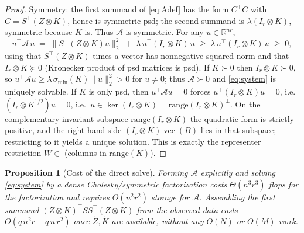 \documentclass[12pt]{article}
\DeclareMathOperator{\vecop}{vec}
\newcommand{\bR}{\mathbb{R}}
\newtheorem{proposition}{Proposition}
\begin{document}
\begin{proof}
Symmetry: the first summand of \eqref{eq:Adef} has the form $C^{\!\top}C$ with
$C=S^{\!\top}(Z\otimes K)$, hence is symmetric psd; the second summand is
$\lambda(I_r\otimes K)$, symmetric because $K$ is. Thus $\mathcal{A}$ is symmetric.
For any $u\in\bR^{nr}$,
\[
  u^{\!\top}\mathcal{A}\,u
  \;=\;\|S^{\!\top}(Z\otimes K)u\|_2^2
  \;+\;\lambda\,u^{\!\top}(I_r\otimes K)\,u
  \;\ge\;\lambda\,u^{\!\top}(I_r\otimes K)\,u\;\ge\;0,
\]
using that $S^{\!\top}(Z\otimes K)$ times a vector has nonnegative squared norm
and that $I_r\otimes K\succeq0$ (Kronecker product of psd matrices is psd).
If $K\succ0$ then $I_r\otimes K\succ0$, so $u^{\!\top}\mathcal{A}u\ge
\lambda\,\sigma_{\min}(K)\|u\|_2^2>0$ for $u\ne0$; thus $\mathcal{A}\succ0$ and
\eqref{eq:system} is uniquely solvable. If $K$ is only psd, then
$u^{\!\top}\mathcal{A}u=0$ forces $u^{\!\top}(I_r\otimes K)u=0$, i.e.\
$(I_r\otimes K^{1/2})u=0$, i.e.\ $u\in\ker(I_r\otimes K)=\mathrm{range}(I_r\otimes
K)^{\perp}$. On the complementary invariant subspace $\mathrm{range}(I_r\otimes K)$
the quadratic form is strictly positive, and the right-hand side
$(I_r\otimes K)\vecop(B)$ lies in that subspace; restricting to it yields a unique
solution. This is exactly the representer restriction $W\in$ (columns in
$\mathrm{range}(K)$).
\end{proof}

\begin{proposition}[Cost of the direct solve]\label{prop:direct}
Forming $\mathcal{A}$ explicitly and solving \eqref{eq:system} by a dense
Cholesky/symmetric factorization costs $\Theta(n^3r^3)$ flops for the
factorization and requires $\Theta(n^2r^2)$ storage for $\mathcal{A}$. Assembling
the first summand $(Z\otimes K)^{\!\top}SS^{\!\top}(Z\otimes K)$ from the observed
data costs $O(q\,n^2 r + q\,n\,r^2)$ once $\widetilde Z,\widetilde K$ are available,
without any $O(N)$ or $O(M)$ work.
\end{proposition}
\end{document}
